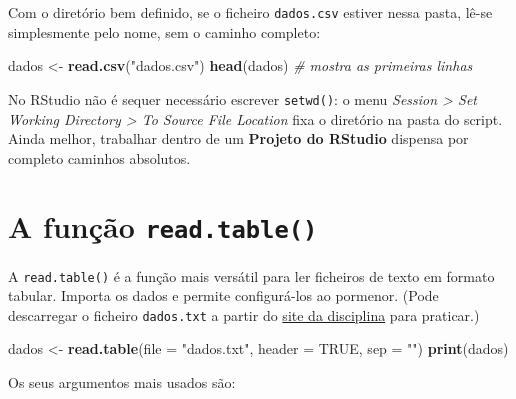 \documentclass[
  portuguese,
  11pt,
  openany]{book}
\newenvironment{Shaded}{\begin{snugshade}}{\end{snugshade}}
\newcommand{\AttributeTok}[1]{\textcolor[rgb]{0.13,0.29,0.53}{#1}}
\newcommand{\CommentTok}[1]{\textcolor[rgb]{0.56,0.35,0.01}{\textit{#1}}}
\newcommand{\ConstantTok}[1]{\textcolor[rgb]{0.56,0.35,0.01}{#1}}
\newcommand{\FunctionTok}[1]{\textcolor[rgb]{0.13,0.29,0.53}{\textbf{#1}}}
\newcommand{\NormalTok}[1]{#1}
\newcommand{\OtherTok}[1]{\textcolor[rgb]{0.56,0.35,0.01}{#1}}
\newcommand{\StringTok}[1]{\textcolor[rgb]{0.31,0.60,0.02}{#1}}
\begin{document}
Com o diretório bem definido, se o ficheiro \texttt{dados.csv} estiver nessa pasta, lê-se
simplesmente pelo nome, sem o caminho completo:

\begin{Shaded}
\begin{Highlighting}[]
\NormalTok{dados }\OtherTok{\textless{}{-}} \FunctionTok{read.csv}\NormalTok{(}\StringTok{"dados.csv"}\NormalTok{)}
\FunctionTok{head}\NormalTok{(dados)   }\CommentTok{\# mostra as primeiras linhas}
\end{Highlighting}
\end{Shaded}

No RStudio não é sequer necessário escrever \texttt{setwd()}: o menu \emph{Session \textgreater{} Set Working
Directory \textgreater{} To Source File Location} fixa o diretório na pasta do script. Ainda
melhor, trabalhar dentro de um \textbf{Projeto do RStudio} dispensa por completo caminhos
absolutos.

\section{\texorpdfstring{A função \texttt{read.table()}}{A função read.table()}}\label{a-funuxe7uxe3o-read.table}

A \texttt{read.table()} é a função mais versátil para ler ficheiros de texto em formato
tabular. Importa os dados e permite configurá-los ao pormenor. (Pode descarregar o
ficheiro \texttt{dados.txt} a partir do
\href{https://renatorpaula.wixsite.com/renato/laboratorio-estatistica}{site da disciplina}
para praticar.)

\begin{Shaded}
\begin{Highlighting}[]
\NormalTok{dados }\OtherTok{\textless{}{-}} \FunctionTok{read.table}\NormalTok{(}\AttributeTok{file =} \StringTok{"dados.txt"}\NormalTok{, }\AttributeTok{header =} \ConstantTok{TRUE}\NormalTok{, }\AttributeTok{sep =} \StringTok{""}\NormalTok{)}
\FunctionTok{print}\NormalTok{(dados)}
\end{Highlighting}
\end{Shaded}

Os seus argumentos mais usados são:
\end{document}
